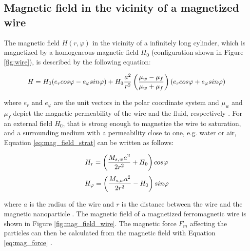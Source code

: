 \subsection{Magnetic field in the vicinity of a magnetized wire}
\label{subsec:mag_field}
The magnetic field $H(r,\varphi)$ in the vicinity of a infinitely long cylinder, which is magnetized by a homogeneous magnetic field $H_{0}$ (configuration shown in Figure \ref{fig:wire}), is described by the following equation:

\begin{equation}
\label{eq:mag_field_strat}
\centering
H = H_{0}(e_{r}cos\varphi-e_{\varphi}sin\varphi)+H_{0}\frac{a^{2}}{r^{2}}\left(\frac{\mu_{w}-\mu_{f}}{\mu_{w}+\mu_{f}}\right)(e_{r}cos\varphi+e_{\varphi}sin\varphi)
\end{equation}

where $e_{r}$ and $e_{\varphi}$ are the unit vectors in the polar coordinate system and $\mu_{w}$ and $\mu_{f}$ depict the magnetic permeability of the wire and the fluid, respectively \cite{stratton2007electromagnetic}. For an external field $H_{0}$, that is strong enough to magnetize the wire to saturation, and a surrounding medium with a permeability close to one, e.g. water or air, Equation \ref{eq:mag_field_strat} can be written as follows:

\begin{equation}
\label{eq:Hr_field}
\centering
H_{r} = \left(\frac{M_{s,w}a^{2}}{2r^{2}}+H_{0}\right)cos\varphi
\end{equation}
\begin{equation}
\label{eq:Hphi_field}
\centering
H_{\varphi} = \left(\frac{M_{s,w}a^{2}}{2r^{2}}-H_{0}\right)sin\varphi
\end{equation}

where $a$ is the radius of the wire and $r$ is the distance between the wire and the magnetic nanoparticle \cite{FranzrebHabil}. The magnetic field of a magnetized ferromagnetic wire is shown in Figure \ref{fig:mag_field_wire}. The magnetic force $F_{m}$ affecting the particles can then be calculated from the magnetic field with Equation \ref{eq:mag_force} \cite{moeser2004high}. 

